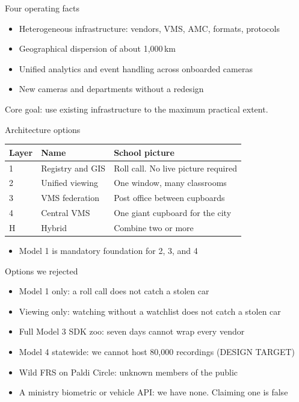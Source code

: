 \documentclass[aspectratio=169,11pt]{beamer}
\begin{document}
\begin{frame}{Four operating facts}
\begin{itemize}\itemsep0.7em
\item Heterogeneous infrastructure: vendors, VMS, AMC, formats, protocols
\item Geographical dispersion of about 1{,}000\,km
\item Unified analytics and event handling across onboarded cameras
\item New cameras and departments without a redesign
\end{itemize}
\medskip
\begin{keyideabox}
Core goal: use existing infrastructure to the maximum practical extent.
\end{keyideabox}
\end{frame}

\begin{frame}{Architecture options}
\begin{center}
\begin{tabular}{@{}llp{}@{}}
\toprule
Layer & Name & School picture \\
\midrule
1 & Registry and GIS & Roll call. No live picture required \\
2 & Unified viewing & One window, many classrooms \\
3 & VMS federation & Post office between cupboards \\
4 & Central VMS & One giant cupboard for the city \\
H & Hybrid & Combine two or more \\
\bottomrule
\end{tabular}
\end{center}
\medskip
\begin{itemize}\itemsep0.5em
\item Model 1 is mandatory foundation for 2, 3, and 4
\end{itemize}
\end{frame}

\begin{frame}{Options we rejected}
\begin{itemize}\itemsep0.55em
\item Model 1 only: a roll call does not catch a stolen car
\item Viewing only: watching without a watchlist does not catch a stolen car
\item Full Model 3 SDK zoo: seven days cannot wrap every vendor
\item Model 4 statewide: we cannot host 80{,}000 recordings (DESIGN TARGET)
\item Wild FRS on Paldi Circle: unknown members of the public
\item A ministry biometric or vehicle API: we have none. Claiming one is false
\end{itemize}
\end{frame}
\end{document}
